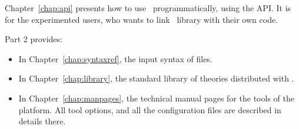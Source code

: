 
Chapter~\ref{chap:api} presents how to use \why\ programmatically,
using the API.  It is for the experimented users, who wants to link
\why\ library with their own code.

Part 2 provides: 
\begin{itemize}
\item In Chapter~\ref{chap:syntaxref}, the input syntax of files.
\item In Chapter~\ref{chap:library}, the standard library of
  theories distributed with \why.
\item In Chapter~\ref{chap:manpages}, the technical manual pages for the
  tools of the platform. All tool options, and all the configuration
  files are described in details there.
\end{itemize}


